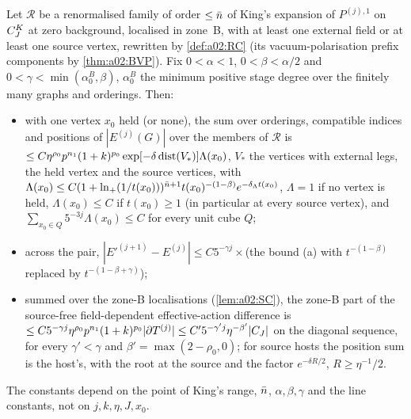 \begin{theorem}\label{thm:a02:Bsc}
Let $\mathcal R$ be a renormalised family of order $\le\bar n$ of King's expansion of $P^{(j),1}$ on $C^{K}_{J}$ at zero background, localised in zone~B, with at least one external field or at least one source vertex, rewritten by \cref{def:a02:RC} (its vacuum-polarisation prefix components by \cref{thm:a02:BVP}). Fix $0<\alpha<1$, $0<\beta<\alpha/2$ and $0<\gamma<\min(\alpha_0^B,\beta)$, $\alpha_0^B$ the minimum positive stage degree over the finitely many graphs and orderings. Then:
\begin{itemize}[nosep]
\item[(a)] with one vertex $x_0$ held (or none), the sum over orderings, compatible indices and positions of $|E^{(j)}(G)|$ over the members of $\mathcal R$ is $\le C\eta^{\rho_0}p^{n_1}(1+k)^{p_0}\exp[-\delta\operatorname{dist}(V_*)]\Lambda(x_0)$, $V_*$ the vertices with external legs, the held vertex and the source vertices, with $\Lambda(x_0)\le C(1+\ln_+(1/t(x_0)))^{\bar n+1}t(x_0)^{-(1-\beta)}e^{-\delta_\Lambda t(x_0)}$, $\Lambda=1$ if no vertex is held, $\Lambda(x_0)\le C$ if $t(x_0)\ge1$ (in particular at every source vertex), and $\sum_{x_0\in Q}5^{-3j}\Lambda(x_0)\le C$ for every unit cube $Q$;
\item[(b)] across the pair, $|E'^{(j+1)}-E^{(j)}|\le C5^{-\gamma j}\times$(the bound (a) with $t^{-(1-\beta)}$ replaced by $t^{-(1-\beta+\gamma)}$);
\item[(c)] summed over the zone-B localisations (\cref{lem:a02:SC}), the zone-B part of the source-free field-dependent effective-action difference is $\le C5^{-\gamma j}\eta^{\rho_0}p^{n_1}(1+k)^{p_0}|\partial T^{(j)}|\le C'5^{-\gamma'j}\eta^{-\beta'}|C_J|$ on the diagonal sequence, for every $\gamma'<\gamma$ and $\beta'=\max(2-\rho_0,0)$; for source hosts the position sum is the host's, with the root at the source and the factor $e^{-\delta R/2}$, $R\ge\eta^{-1}/2$.
\end{itemize}
The constants depend on the point of King's range, $\bar n$, $\alpha,\beta,\gamma$ and the line constants, not on $j,k,\eta,J,x_0$.
\end{theorem}
